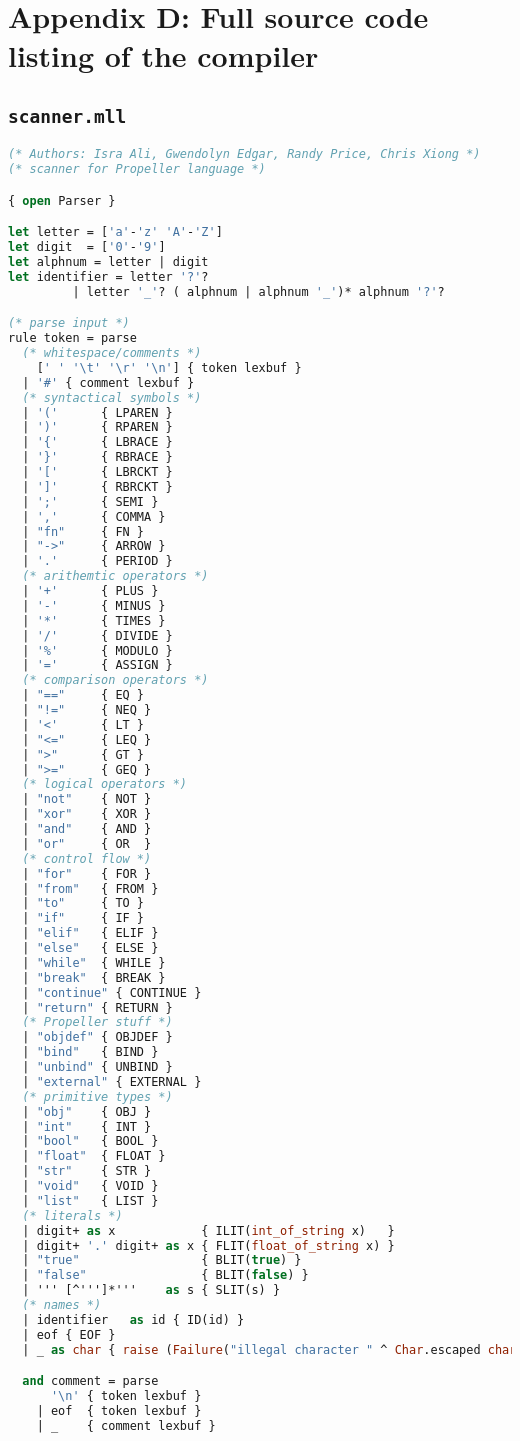 \section{Appendix D: Full source code listing of the compiler}

\subsection{\texttt{scanner.mll}}

\begin{lstlisting}[language=Caml,backgroundcolor=\color{backgroundcolor}]
(* Authors: Isra Ali, Gwendolyn Edgar, Randy Price, Chris Xiong *)
(* scanner for Propeller language *)

{ open Parser }

let letter = ['a'-'z' 'A'-'Z']
let digit  = ['0'-'9']
let alphnum = letter | digit
let identifier = letter '?'?
         | letter '_'? ( alphnum | alphnum '_')* alphnum '?'?

(* parse input *)
rule token = parse
  (* whitespace/comments *)
    [' ' '\t' '\r' '\n'] { token lexbuf }
  | '#' { comment lexbuf }
  (* syntactical symbols *)
  | '('      { LPAREN }
  | ')'      { RPAREN }
  | '{'      { LBRACE }
  | '}'      { RBRACE }
  | '['      { LBRCKT }
  | ']'      { RBRCKT }
  | ';'      { SEMI }
  | ','      { COMMA }
  | "fn"     { FN }
  | "->"     { ARROW }
  | '.'      { PERIOD }
  (* arithemtic operators *)
  | '+'      { PLUS }
  | '-'      { MINUS }
  | '*'      { TIMES }
  | '/'      { DIVIDE }
  | '%'      { MODULO }
  | '='      { ASSIGN }
  (* comparison operators *)
  | "=="     { EQ }
  | "!="     { NEQ }
  | '<'      { LT }
  | "<="     { LEQ }
  | ">"      { GT }
  | ">="     { GEQ }
  (* logical operators *)
  | "not"    { NOT }
  | "xor"    { XOR }
  | "and"    { AND }
  | "or"     { OR  }
  (* control flow *)
  | "for"    { FOR }
  | "from"   { FROM }
  | "to"     { TO }
  | "if"     { IF }
  | "elif"   { ELIF }
  | "else"   { ELSE }
  | "while"  { WHILE }
  | "break"  { BREAK }
  | "continue" { CONTINUE }
  | "return" { RETURN }
  (* Propeller stuff *)
  | "objdef" { OBJDEF }
  | "bind"   { BIND }
  | "unbind" { UNBIND }
  | "external" { EXTERNAL }
  (* primitive types *)
  | "obj"    { OBJ }
  | "int"    { INT }
  | "bool"   { BOOL }
  | "float"  { FLOAT }
  | "str"    { STR }
  | "void"   { VOID }
  | "list"   { LIST }
  (* literals *)
  | digit+ as x            { ILIT(int_of_string x)   } 
  | digit+ '.' digit+ as x { FLIT(float_of_string x) }
  | "true"                 { BLIT(true) }
  | "false"                { BLIT(false) }
  | ''' [^''']*'''    as s { SLIT(s) }
  (* names *)
  | identifier   as id { ID(id) }
  | eof { EOF }
  | _ as char { raise (Failure("illegal character " ^ Char.escaped char)) }

  and comment = parse
      '\n' { token lexbuf }
    | eof  { token lexbuf }
    | _    { comment lexbuf }
\end{lstlisting}

